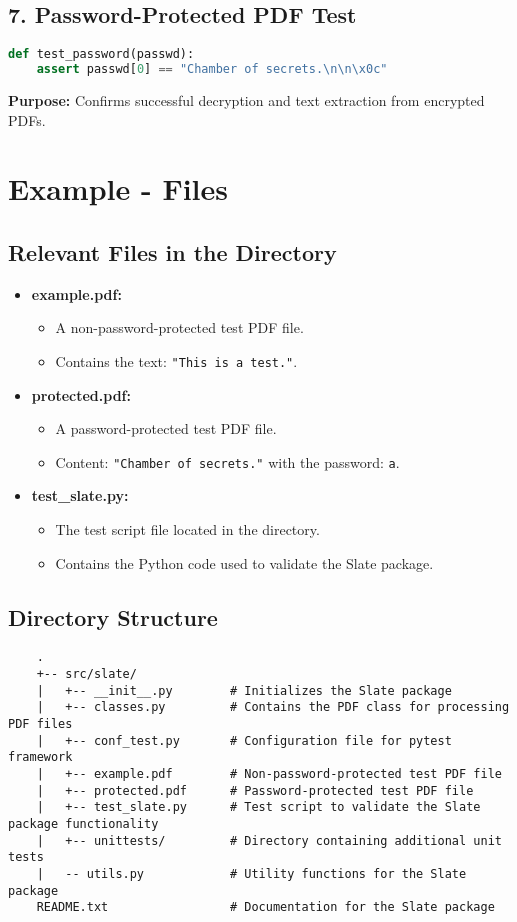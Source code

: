 \subsection{7. Password-Protected PDF Test}
\begin{lstlisting}[language=Python]
	def test_password(passwd):
	assert passwd[0] == "Chamber of secrets.\n\n\x0c"
\end{lstlisting}
\textbf{Purpose:} Confirms successful decryption and text extraction from encrypted PDFs.

\section{Example - Files}
\subsection{Relevant Files in the Directory}
\begin{itemize}
	\item \textbf{example.pdf:} 
	\begin{itemize}
		\item A non-password-protected test PDF file.
		\item Contains the text: \texttt{"This is a test."}.
	\end{itemize}
	\item \textbf{protected.pdf:} 
	\begin{itemize}
		\item A password-protected test PDF file.
		\item Content: \texttt{"Chamber of secrets."} with the password: \texttt{a}.
	\end{itemize}
	\item \textbf{test\_slate.py:} 
	\begin{itemize}
		\item The test script file located in the directory.
		\item Contains the Python code used to validate the Slate package.
	\end{itemize}
\end{itemize}

\subsection{Directory Structure}
\begin{verbatim}
	.
	+-- src/slate/
	|   +-- __init__.py        # Initializes the Slate package
	|   +-- classes.py         # Contains the PDF class for processing PDF files
	|   +-- conf_test.py       # Configuration file for pytest framework
	|   +-- example.pdf        # Non-password-protected test PDF file
	|   +-- protected.pdf      # Password-protected test PDF file
	|   +-- test_slate.py      # Test script to validate the Slate package functionality
	|   +-- unittests/         # Directory containing additional unit tests
	|   -- utils.py            # Utility functions for the Slate package
	README.txt                 # Documentation for the Slate package
\end{verbatim}


